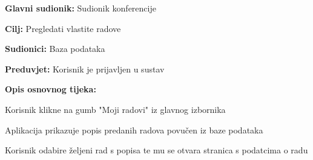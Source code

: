 					\noindent {}
					\begin{packed_item}
						
						\item \textbf{Glavni sudionik: } Sudionik konferencije
						\item  \textbf{Cilj:} Pregledati vlastite radove
						\item  \textbf{Sudionici:} Baza podataka
						\item  \textbf{Preduvjet:} Korisnik je prijavljen u sustav
						\item  \textbf{Opis osnovnog tijeka:}
						
						\item[] \begin{packed_enum}
							
							\item Korisnik klikne na gumb "Moji radovi" iz glavnog izbornika
							\item Aplikacija prikazuje popis predanih radova povučen iz baze podataka
							\item Korisnik odabire željeni rad s popisa te mu se otvara stranica s podatcima o radu
					
						\end{packed_enum}                
						
					\end{packed_item}
						\noindent {}
